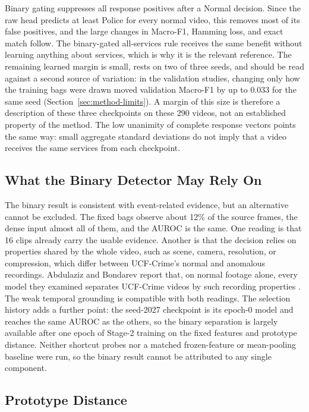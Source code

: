 Binary gating suppresses all response positives after a Normal decision. Since
the raw head predicts at least Police for every normal video, this removes most
of its false positives, and the large changes in Macro-F1, Hamming loss, and
exact match follow. The binary-gated all-services rule receives the same
benefit without learning anything about services, which is why it is the
relevant reference. The remaining learned margin is small, rests on two of three
seeds, and should be read against a second source of variation: in the
validation studies, changing only how the training bags were drawn moved
validation Macro-F1 by up to 0.033 for the same seed
(Section~\ref{sec:method-limits}). A margin of this size is therefore a description
of these three checkpoints on these 290 videos, not an established property of
the method. The low unanimity of complete response vectors points the same way:
small aggregate standard deviations do not imply that a video receives the same
services from each checkpoint.

\subsection{What the Binary Detector May Rely On}
\label{sec:discussion-binary}

The binary result is consistent with event-related evidence, but an alternative
cannot be excluded. The fixed bags observe about 12\% of the source frames, the
dense input almost all of them, and the AUROC is the same. One reading is that
16 clips already carry the usable evidence. Another is that the decision relies
on properties shared by the whole video, such as scene, camera, resolution, or
compression, which differ between UCF-Crime's normal and anomalous recordings.
Abdulaziz and Bondarev report that, on normal footage alone, every model they
examined separates UCF-Crime videos by such recording properties
\cite{abdulaziz2026auditing}. The weak temporal grounding is compatible with
both readings. The selection history adds a further point: the seed-2027
checkpoint is its epoch-0 model and reaches the same AUROC as the others, so the
binary separation is largely available after one epoch of Stage-2 training on
the fixed features and prototype distance. Neither shortcut probes nor a
matched frozen-feature or mean-pooling baseline were run, so the binary result
cannot be attributed to any single component.

\subsection{Prototype Distance}

